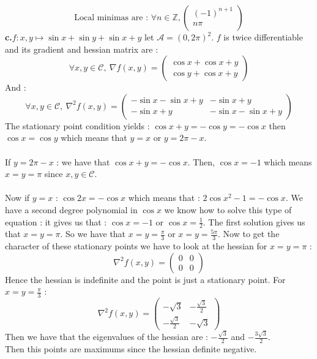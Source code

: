 \documentclass{article}
\begin{document}
$$\boxed{\text{Local minimas are : }\forall n\in\mathbb{Z}, \left(\begin{array}{c}
    (-1)^{n+1}\\
    n\pi\\
\end{array}\right)}$$
\textbf{c.}$f : x,y \mapsto \sin{x}+\sin{y}+\sin{x+y}$ let $\mathcal{A}=(0,2\pi)^2$.
$f$ is twice differentiable and its gradient and hessian matrix are : 
$$\forall x,y\in\mathcal{C}, \ \nabla f (x,y)=\begin{pmatrix}
\cos{x}+\cos{x+y}  \\
\cos{y}+\cos{x+y}
\end{pmatrix} $$
And : 
$$\forall x,y\in\mathcal{C}, \ \nabla^2 f (x,y)=\begin{pmatrix}
-\sin{x}-\sin{x+y} & -\sin{x+y}  \\
-\sin{x+y} & -\sin{x}-\sin{x+y}
\end{pmatrix} $$
The stationary point condition yields : $\cos{x+y}=-\cos{y}=-\cos{x}$ then $\cos{x}=\cos{y}$ which means that $y=x$ or $y=2\pi-x$.
\\\\
If $y=2\pi-x$ : we have that $\cos{x+y}=-\cos{x}$. Then, $\cos{x}=-1$ which means $\boxed{x=y=\pi}$ since $x,y\in \mathcal{C}$.
\\\\
Now if $y=x$ : $\cos{2x}=-\cos{x}$ which means that : $2\cos{x}^2-1=-\cos{x}$. We have a second degree polynomial in $\cos{x}$ we know how to solve this type of equation : it gives us that : $\cos{x}=-1$ or $\cos{x}=\frac{1}{2}$. The first solution gives us that $\boxed{x=y=\pi}$. So we have that $\boxed{x=y=\frac{\pi}{3}}$ or $\boxed{x=y=\frac{5\pi}{3}}$.
Now to get the character of these stationary points we have to look at the hessian for $x=y=\pi$  : \\
$$ \nabla^2 f (x,y)=\begin{pmatrix}
0 & 0 \\
0 & 0
\end{pmatrix}$$
Hence the hessian is indefinite and the point is just a stationary point.
For $x=y=\frac{\pi}{3}$  :
$$ \nabla^2 f (x,y)=\begin{pmatrix}
-\sqrt{3} & -\frac{\sqrt{3}}{2} \\
-\frac{\sqrt{3}}{2} & -\sqrt{3}
\end{pmatrix} $$
Then we have that the eigenvalues of the hessian are : $-\frac{\sqrt{3}}{2}$ and $-\frac{3\sqrt{3}}{2}$. \\
Then this points are maximums since the hessian definite negative.\\
\end{document}
